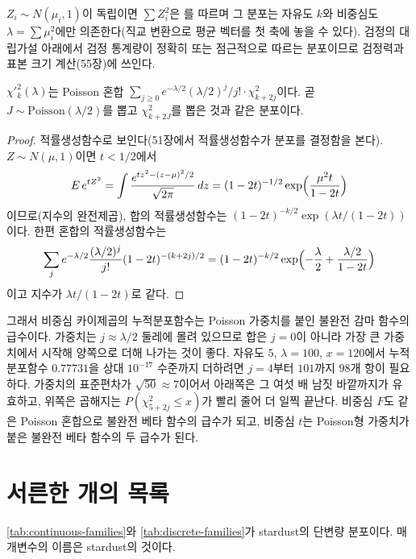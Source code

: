 $Z_i\sim N(\mu_i,1)$이 독립이면 $\sum Z_i^2$은 를 따르며 그 분포는 자유도 $k$와 비중심도 $\lambda=\sum\mu_i^2$에만 의존한다(직교 변환으로 평균 벡터를 첫 축에 놓을 수 있다). 검정의 대립가설 아래에서 검정 통계량이 정확히 또는 점근적으로 따르는 분포이므로 검정력과 표본 크기 계산(55장)에 쓰인다.

\begin{proposition}
\label{prop:noncentral-mixture}
$\chi'^2_k(\lambda)$는 Poisson 혼합 $\sum_{j\ge0}e^{-\lambda/2}(\lambda/2)^j/j!\cdot\chi^2_{k+2j}$이다. 곧 $J\sim\mathrm{Poisson}(\lambda/2)$를 뽑고 $\chi^2_{k+2J}$를 뽑은 것과 같은 분포이다.
\end{proposition}

\begin{proof}
적률생성함수로 보인다(51장에서 적률생성함수가 분포를 결정함을 본다). $Z\sim N(\mu,1)$이면 $t<1/2$에서
\[
E\,e^{tZ^2}=\int\frac{e^{tz^2-(z-\mu)^2/2}}{\sqrt{2\pi}}\,dz=(1-2t)^{-1/2}\exp\Bigl(\frac{\mu^2t}{1-2t}\Bigr)
\]
이므로(지수의 완전제곱), 합의 적률생성함수는 $(1-2t)^{-k/2}\exp(\lambda t/(1-2t))$이다. 한편 혼합의 적률생성함수는
\[
\sum_je^{-\lambda/2}\frac{(\lambda/2)^j}{j!}(1-2t)^{-(k+2j)/2}=(1-2t)^{-k/2}\exp\Bigl(-\frac\lambda2+\frac{\lambda/2}{1-2t}\Bigr)
\]
이고 지수가 $\lambda t/(1-2t)$로 같다.
\end{proof}

그래서 비중심 카이제곱의 누적분포함수는 Poisson 가중치를 붙인 불완전 감마 함수의 급수이다. 가중치는 $j\approx\lambda/2$ 둘레에 몰려 있으므로 합은 $j=0$이 아니라 가장 큰 가중치에서 시작해 양쪽으로 더해 나가는 것이 좋다. 자유도 $5$, $\lambda=100$, $x=120$에서 누적분포함수 $0.77731$을 상대 $10^{-17}$ 수준까지 더하려면 $j=4$부터 $101$까지 $98$개 항이 필요하다. 가중치의 표준편차가 $\sqrt{50}\approx7$이어서 아래쪽은 그 여섯 배 남짓 바깥까지가 유효하고, 위쪽은 곱해지는 $P(\chi^2_{5+2j}\le x)$가 빨리 줄어 더 일찍 끝난다. 비중심 $F$도 같은 Poisson 혼합으로 불완전 베타 함수의 급수가 되고, 비중심 $t$는 Poisson형 가중치가 붙은 불완전 베타 함수의 두 급수가 된다.

\section{서른한 개의 목록}
\label{sec:family-list}

\cref{tab:continuous-families}와 \cref{tab:discrete-families}가 stardust의 단변량 분포이다. 매개변수의 이름은 stardust의 것이다.

